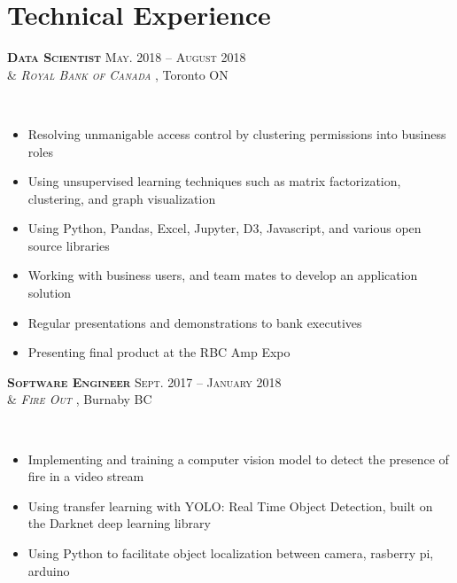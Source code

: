 \documentclass[10pt]{article} %
\begin{document}
\begin{minipage}[t]{0.52\textwidth} %
\vspace{0pt} %



\section{Technical Experience} 


{\raggedright\textsc{\textbf{Data Scientist} \hfill May. 2018 -- August 2018\\
& \textit{Royal Bank of Canada }}, Toronto ON} \\
\begin{itemize}
\item Resolving unmanigable access control by clustering permissions into business roles
\item Using unsupervised learning techniques such as matrix factorization, clustering, and graph visualization
\item Using Python, Pandas, Excel, Jupyter, D3, Javascript, and various open source libraries
\item Working with business users, and team mates to develop an application solution
\item Regular presentations and demonstrations to bank executives
\item Presenting final product at the RBC Amp Expo
\end{itemize} 


{\raggedright\textsc{\textbf{Software Engineer} \hfill Sept. 2017 -- January 2018\\
& \textit{Fire Out }}, Burnaby BC} \\
\begin{itemize}
\item Implementing and training a computer vision model to detect the presence of fire in a video stream
\item Using transfer learning with YOLO: Real Time Object Detection, built on the Darknet deep learning library
\item Using Python to facilitate object localization between camera, rasberry pi, arduino
\end{itemize} 


\end{minipage}
\end{document}

